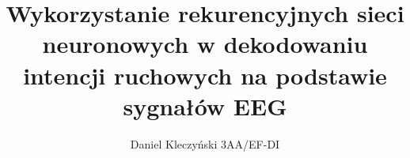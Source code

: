 \documentclass{article}
\author{Daniel Kleczyński 3AA/EF-DI}
\title{Wykorzystanie rekurencyjnych sieci neuronowych w
dekodowaniu intencji ruchowych na podstawie sygnałów EEG}
\begin{document}
    \maketitle
    \blankpage
    \tableofcontents
    \clearpage
    \blankpage
    
    
    
    
    
    
    
    

    \clearpage
    \blankpage

    \printbibliography
\end{document}
